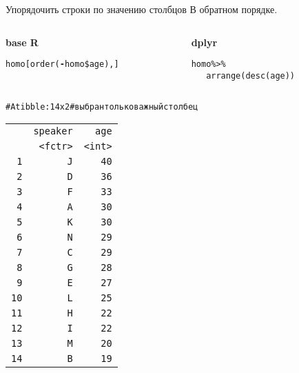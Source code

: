 \begin{frame}{Упорядочить строки по значению столбцов}
\noindent В обратном порядке.\\ \vfill
\begin{columns}[T] 
\begin{column}{.60\textwidth}
\textbf{base R}\\
\scriptsize
\begin{alltt}
homo[order(\alert{\textbf{-}}homo\$age), ]
\end{alltt}
\normalsize
\end{column}
\hfill
\begin{column}{.37\textwidth}
\textbf{dplyr}\\
\scriptsize
\begin{alltt}
homo \alert{\%>\%}\\ 
\ \ \ \alert{arrange(}\alert{desc(}age\alert{))}
\end{alltt}
\normalsize
\end{column}
\end{columns}
\hfill
\scriptsize
\begin{alltt}
\# A tibble: 14 x 2 \hfill \# выбран только важный столбец\\
\begin{tabular}{rrr}
 & speaker & age \\ 
 & <fctr> & <int> \\ 
1 & J & 40 \\ 
2 & D & 36 \\ 
3 & F & 33 \\ 
4 & A & 30 \\ 
5 & K & 30 \\ 
6 & N & 29 \\ 
7 & C & 29 \\ 
8 & G & 28 \\ 
9 & E & 27 \\ 
10 & L & 25 \\ 
11 & H & 22 \\ 
12 & I & 22 \\ 
13 & M & 20 \\ 
14 & B & 19 \\ 
\end{tabular}
\\
\end{alltt}
\normalsize
\hfill\\
\end{frame}
